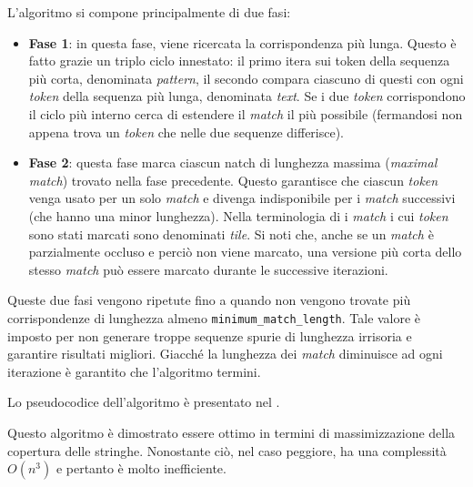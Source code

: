L'algoritmo si compone principalmente di due fasi:
\begin{itemize}
	\item \textbf{Fase 1}: in questa fase, viene ricercata la corrispondenza più lunga. Questo è fatto grazie un triplo ciclo innestato: il primo itera sui token della sequenza più corta, denominata \textit{pattern}, il secondo compara ciascuno di questi con ogni \textit{token} della sequenza più lunga, denominata \textit{text}. Se i due \textit{token} corrispondono il ciclo più interno cerca di estendere il \textit{match} il più possibile (fermandosi non appena trova un \textit{token} che nelle due sequenze differisce).

	\item \textbf{Fase 2}: questa fase marca ciascun natch di lunghezza massima (\textit{maximal match}) trovato nella fase precedente. Questo garantisce che ciascun \textit{token} venga usato per un solo \textit{match} e divenga indisponibile per i \textit{match} successivi (che hanno una minor lunghezza). Nella terminologia di \cite{wise-running-93} i \textit{match} i cui \textit{token} sono stati marcati sono denominati \textit{tile}. Si noti che, anche se un \textit{match} è parzialmente occluso e perciò non viene marcato, una versione più corta dello stesso \textit{match} può essere marcato durante le successive iterazioni.
\end{itemize}

Queste due fasi vengono ripetute fino a quando non vengono trovate più corrispondenze di lunghezza almeno \texttt{minimum\_match\_length}.
%
Tale valore è imposto per non generare troppe sequenze spurie di lunghezza irrisoria e garantire risultati migliori.
%
Giacché la lunghezza dei \textit{match} diminuisce ad ogni iterazione è garantito che l'algoritmo termini.

Lo pseudocodice dell'algoritmo è presentato nel .



Questo algoritmo è dimostrato \cite{wise-running-93} essere ottimo in termini di massimizzazione della copertura delle stringhe.
%
Nonostante ciò, nel caso peggiore, ha una complessità $O(n^3)$ e pertanto è molto inefficiente.

